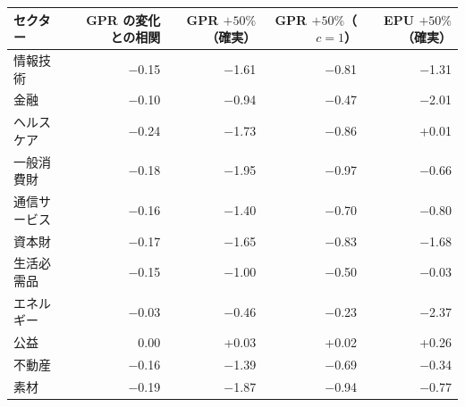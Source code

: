 \begin{tabular}{lrrrr}
\toprule
セクター & GPR の変化との相関 & GPR $+50\%$（確実） & GPR $+50\%$（$c=1$） & EPU $+50\%$（確実） \\
\midrule
情報技術 & \ensuremath{-}0.15 & \ensuremath{-}1.61 & \ensuremath{-}0.81 & \ensuremath{-}1.31 \\
金融 & \ensuremath{-}0.10 & \ensuremath{-}0.94 & \ensuremath{-}0.47 & \ensuremath{-}2.01 \\
ヘルスケア & \ensuremath{-}0.24 & \ensuremath{-}1.73 & \ensuremath{-}0.86 & +0.01 \\
一般消費財 & \ensuremath{-}0.18 & \ensuremath{-}1.95 & \ensuremath{-}0.97 & \ensuremath{-}0.66 \\
通信サービス & \ensuremath{-}0.16 & \ensuremath{-}1.40 & \ensuremath{-}0.70 & \ensuremath{-}0.80 \\
資本財 & \ensuremath{-}0.17 & \ensuremath{-}1.65 & \ensuremath{-}0.83 & \ensuremath{-}1.68 \\
生活必需品 & \ensuremath{-}0.15 & \ensuremath{-}1.00 & \ensuremath{-}0.50 & \ensuremath{-}0.03 \\
エネルギー & \ensuremath{-}0.03 & \ensuremath{-}0.46 & \ensuremath{-}0.23 & \ensuremath{-}2.37 \\
公益 & 0.00 & +0.03 & +0.02 & +0.26 \\
不動産 & \ensuremath{-}0.16 & \ensuremath{-}1.39 & \ensuremath{-}0.69 & \ensuremath{-}0.34 \\
素材 & \ensuremath{-}0.19 & \ensuremath{-}1.87 & \ensuremath{-}0.94 & \ensuremath{-}0.77 \\
\bottomrule
\end{tabular}
